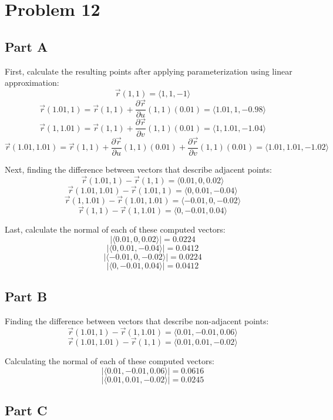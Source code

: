 \documentclass{article}
\begin{document}
\section*{Problem 12}

\subsection*{Part A}

First, calculate the resulting points after applying parameterization using
linear approximation:
$$ \vec{r}(1, 1) = \langle 1, 1, -1 \rangle $$
$$ \vec{r}(1.01, 1) = \vec{r}(1,1) + \frac{\partial \vec{r}}{\partial
u}(1,1)(0.01) = \langle 1.01, 1, -0.98 \rangle $$
$$ \vec{r}(1, 1.01) = \vec{r}(1, 1) + \frac{\partial \vec{r}}{\partial v}(1, 1)
(0.01) = \langle 1, 1.01, -1.04 \rangle $$
$$ \vec{r}(1.01, 1.01) = \vec{r}(1,1) + \frac{\partial \vec{r}}{\partial
u}(1,1)(0.01) + \frac{\partial \vec{r}}{\partial v}(1,1)(0.01) = \langle 1.01,
1.01, -1.02 \rangle $$

Next, finding the difference between vectors that describe adjacent points:
$$ \vec{r}(1.01, 1) - \vec{r}(1,1) = \langle 0.01, 0, 0.02 \rangle $$
$$ \vec{r}(1.01, 1.01) - \vec{r}(1.01, 1) = \langle 0, 0.01, -0.04 \rangle $$
$$ \vec{r}(1, 1.01) - \vec{r}(1.01, 1.01) = \langle -0.01, 0, -0.02 \rangle $$
$$ \vec{r}(1, 1) - \vec{r}(1, 1.01) = \langle 0, -0.01, 0.04 \rangle $$

Last, calculate the normal of each of these computed vectors:
$$ \vert \langle 0.01, 0, 0.02 \rangle \vert = 0.0224 $$
$$ \vert \langle 0, 0.01, -0.04 \rangle \vert = 0.0412 $$
$$ \vert \langle -0.01, 0, -0.02 \rangle \vert = 0.0224 $$
$$ \vert \langle 0, -0.01, 0.04 \rangle \vert = 0.0412 $$

\subsection*{Part B}

Finding the difference between vectors that describe non-adjacent points:
$$ \vec{r}(1.01, 1) - \vec{r}(1, 1.01) = \langle 0.01, -0.01, 0.06 \rangle $$
$$ \vec{r}(1.01, 1.01) - \vec{r}(1, 1) = \langle 0.01, 0.01, -0.02 \rangle $$

Calculating the normal of each of these computed vectors:
$$ \vert \langle 0.01, -0.01, 0.06 \rangle \vert = 0.0616 $$
$$ \vert \langle 0.01, 0.01, -0.02 \rangle \vert = 0.0245 $$

\subsection*{Part C}
\end{document}

